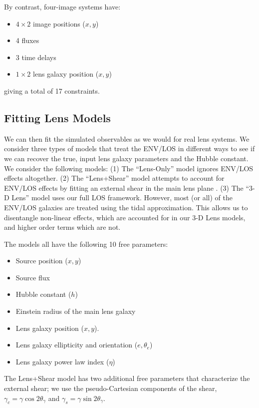\documentclass{emulateapj}
\begin{document}
By contrast, four-image systems have:
\begin{itemize}
\item $4\times 2$ image positions ($x,y$)
\item 4 fluxes
\item 3 time delays
\item $1\times 2$ lens galaxy position ($x,y$) 
\end{itemize}
giving a total of 17 constraints.



\subsection{Fitting Lens Models \label{sec:lensmodels}}

We can then fit the simulated observables as we would for real lens systems. We consider three types of models that treat the ENV/LOS in different ways to see if we can recover the true, input lens galaxy parameters and the Hubble constant. We consider the following models:
(1) The ``Lens-Only'' model ignores ENV/LOS effects altogether.
(2) The ``Lens+Shear'' model attempts to account for ENV/LOS effects by fitting an external shear in the main lens plane \citep[e.g.,][]{Suyu13}.
(3) The ``3-D Lens'' model uses our full LOS framework. However, most (or all) of the ENV/LOS galaxies are treated using the tidal approximation. This allows us to disentangle non-linear effects, which are accounted for in our 3-D Lens models, and higher order terms which are not.

The models all have the following 10 free parameters:
\begin{itemize}
\item Source position ($x,y$)
\item Source flux
\item Hubble constant ($h$)
\item Einstein radius of the main lens galaxy
\item Lens galaxy position ($x,y$).
\item Lens galaxy ellipticity and orientation ($e,\theta_e$)
\item Lens galaxy power law index ($\eta$)
\end{itemize}
The Lens+Shear model has two additional free parameters that characterize the external shear; we use the pseudo-Cartesian components of the shear, $\gamma_c = \gamma \cos 2\theta_\gamma$ and $\gamma_s = \gamma \sin 2\theta_\gamma$.
\end{document}
